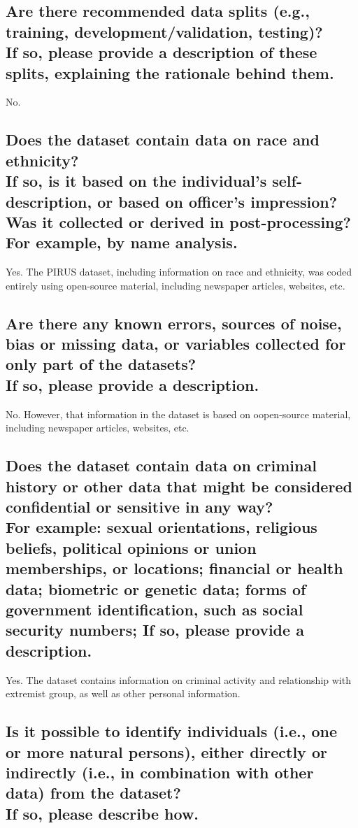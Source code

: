 \documentclass[letterpaper, 10 pt, conference]{ieeeconf}  %
\newcommand{\subtitle}[1]{{\\ \small \normalfont \color{purple} #1}}
\begin{document}
\subsection{Are there recommended data splits (e.g., training, development/validation, testing)? \subtitle{If so, please provide a description of these splits, explaining the rationale behind them.}}

No.

\subsection{Does the dataset contain data on race and ethnicity? \subtitle{If so, is it based on the individual's self-description, or based on officer's impression? Was it collected or derived in post-processing? For example, by name analysis.}}

Yes. The PIRUS dataset, including information on race and ethnicity, was coded entirely using open-source material, including newspaper articles, websites, etc.

\subsection{Are there any known errors, sources of noise, bias or missing data, or variables collected for only part of the datasets? \subtitle{If so, please provide a description.}}

No. However, that information in the dataset is based on oopen-source material, including newspaper articles, websites, etc.

\subsection{Does the dataset contain data on criminal history or other data that might be considered confidential or sensitive in any way? \subtitle{For example: sexual orientations, religious beliefs, political opinions or union memberships, or locations; financial or health data; biometric or genetic data; forms of government identification, such as social security numbers; If so, please provide a description.}}

Yes. The dataset contains information on criminal activity and relationship with extremist group, as well as other personal information.  

\subsection{Is it possible to identify individuals (i.e., one or more natural persons), either directly or indirectly (i.e., in combination with other data) from the dataset? \subtitle{If so, please describe how.}}
\end{document}
